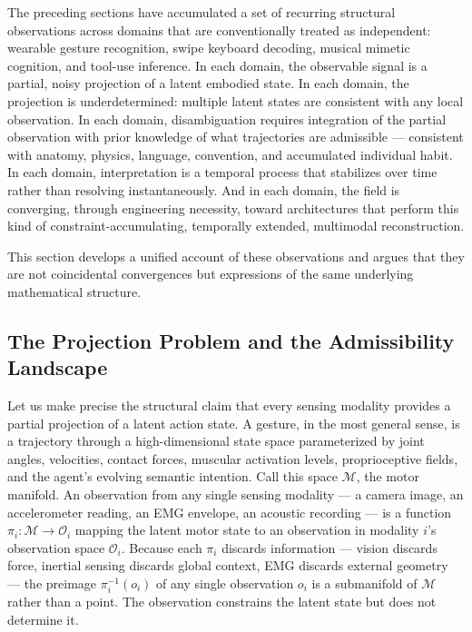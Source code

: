 \documentclass[11pt, a4paper]{article}
\theoremstyle{definition}
\begin{document}
The preceding sections have accumulated a set of recurring structural observations across domains that are conventionally treated as independent: wearable gesture recognition, swipe keyboard decoding, musical mimetic cognition, and tool-use inference. In each domain, the observable signal is a partial, noisy projection of a latent embodied state. In each domain, the projection is underdetermined: multiple latent states are consistent with any local observation. In each domain, disambiguation requires integration of the partial observation with prior knowledge of what trajectories are admissible --- consistent with anatomy, physics, language, convention, and accumulated individual habit. In each domain, interpretation is a temporal process that stabilizes over time rather than resolving instantaneously. And in each domain, the field is converging, through engineering necessity, toward architectures that perform this kind of constraint-accumulating, temporally extended, multimodal reconstruction.

This section develops a unified account of these observations and argues that they are not coincidental convergences but expressions of the same underlying mathematical structure.

\subsection{The Projection Problem and the Admissibility Landscape}

Let us make precise the structural claim that every sensing modality provides a partial projection of a latent action state. A gesture, in the most general sense, is a trajectory through a high-dimensional state space parameterized by joint angles, velocities, contact forces, muscular activation levels, proprioceptive fields, and the agent's evolving semantic intention. Call this space $\mathcal{M}$, the motor manifold. An observation from any single sensing modality --- a camera image, an accelerometer reading, an EMG envelope, an acoustic recording --- is a function $\pi_i : \mathcal{M} \to \mathcal{O}_i$ mapping the latent motor state to an observation in modality $i$'s observation space $\mathcal{O}_i$. Because each $\pi_i$ discards information --- vision discards force, inertial sensing discards global context, EMG discards external geometry --- the preimage $\pi_i^{-1}(o_i)$ of any single observation $o_i$ is a submanifold of $\mathcal{M}$ rather than a point. The observation constrains the latent state but does not determine it.
\end{document}
